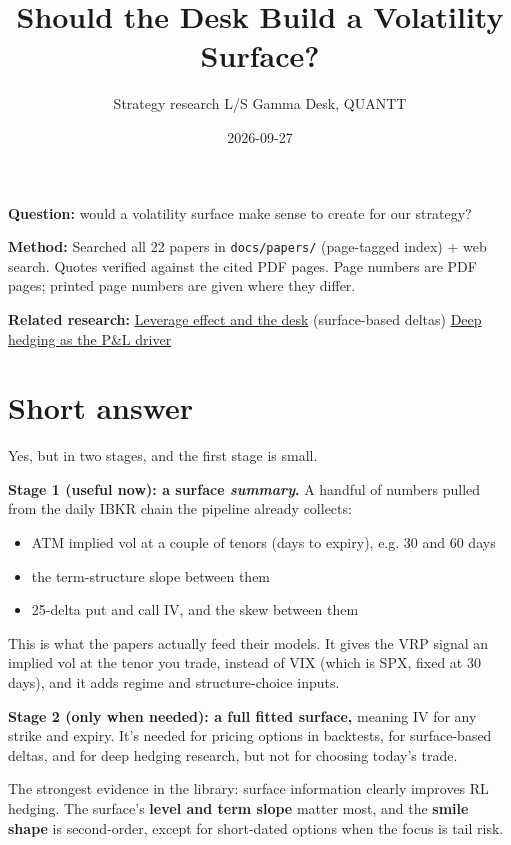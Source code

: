 \documentclass{article}
\title{Should the Desk Build a Volatility Surface?}
\author{Strategy research \textperiodcentered{} L/S Gamma Desk, QUANTT}
\date{2026-09-27}
\begin{document}
\maketitle

\textbf{Question:} would a volatility surface make sense to create for our strategy?

\textbf{Method:} Searched all 22 papers in \texttt{docs/\allowbreak{}papers/\allowbreak{}} (page-tagged index) + web search. Quotes verified against the cited PDF pages. Page numbers are PDF pages; printed page numbers are given where they differ.

\textbf{Related research:} \href{2026-09-27-leverage-effect-and-the-ls-gamma-desk.pdf}{Leverage effect and the desk} (surface-based deltas) \textperiodcentered{} \href{2026-09-27-deep-hedging-as-gamma-scalping-pnl-driver.pdf}{Deep hedging as the P\&L driver}

\section{Short answer}

Yes, but in two stages, and the first stage is small.

\textbf{Stage 1 (useful now): a surface \emph{summary}.} A handful of numbers pulled from the daily IBKR chain the pipeline already collects:

\begin{itemize}

\item ATM implied vol at a couple of tenors (days to expiry), e.g. 30 and 60 days

\item the term-structure slope between them

\item 25-delta put and call IV, and the skew between them

\end{itemize}

This is what the papers actually feed their models. It gives the VRP signal an implied vol at the tenor you trade, instead of VIX (which is SPX, fixed at 30 days), and it adds regime and structure-choice inputs.

\textbf{Stage 2 (only when needed): a full fitted surface,} meaning IV for any strike and expiry. It's needed for pricing options in backtests, for surface-based deltas, and for deep hedging research, but not for choosing today's trade.

The strongest evidence in the library: surface information clearly improves RL hedging. The surface's \textbf{level and term slope} matter most, and the \textbf{smile shape} is second-order, except for short-dated options when the focus is tail risk.
\end{document}
